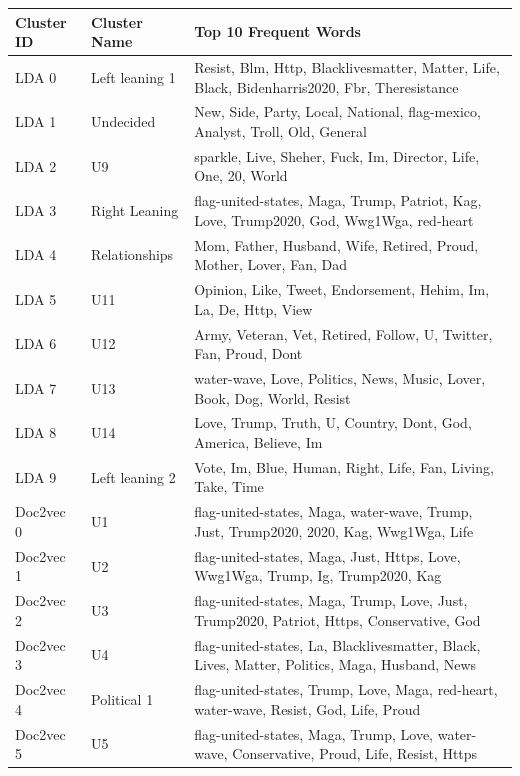 \documentclass{article}
\begin{document}
\begin{table}[h!]
\centering
\begin{tabular}{|l|l|p{13cm}|} 
 \hline
 Cluster ID & Cluster Name & Top 10 Frequent Words \\ [0.5ex] 
 \hline
 LDA 0 & Left leaning 1 & Resist, Blm, Http, Blacklivesmatter, Matter, Life, Black, Bidenharris2020, Fbr, Theresistance \\ \hline 
 LDA 1 & Undecided & New, Side, Party, Local, National, flag-mexico, Analyst, Troll, Old, General \\ \hline
 LDA 2 & U9 & sparkle, Live, Sheher, Fuck, Im, Director, Life, One, 20, World \\ \hline
 LDA 3 & Right Leaning & flag-united-states, Maga, Trump, Patriot, Kag, Love, Trump2020, God, Wwg1Wga, red-heart \\ \hline 
 LDA 4 & Relationships & Mom, Father, Husband, Wife, Retired, Proud, Mother, Lover, Fan, Dad \\ \hline
 LDA 5 & U11 & Opinion, Like, Tweet, Endorsement, Hehim, Im, La, De, Http, View \\ \hline
 LDA 6 & U12 & Army, Veteran, Vet, Retired, Follow, U, Twitter, Fan, Proud, Dont \\ \hline
 LDA 7 & U13 & water-wave, Love, Politics, News, Music, Lover, Book, Dog, World, Resist \\ \hline
 LDA 8 & U14 & Love, Trump, Truth, U, Country, Dont, God, America, Believe, Im \\ \hline
 LDA 9 & Left leaning 2 & Vote, Im, Blue, Human, Right, Life, Fan, Living, Take, Time \\ \hline
 Doc2vec 0 & U1 & flag-united-states, Maga, water-wave, Trump, Just, Trump2020, 2020, Kag, Wwg1Wga, Life \\ \hline 
 Doc2vec 1 & U2 & flag-united-states, Maga, Just, Https, Love, Wwg1Wga, Trump, Ig, Trump2020, Kag \\ \hline
 Doc2vec 2 & U3 & flag-united-states, Maga, Trump, Love, Just, Trump2020, Patriot, Https, Conservative, God \\ \hline
 Doc2vec 3 & U4 & flag-united-states, La, Blacklivesmatter, Black, Lives, Matter, Politics, Maga, Husband, News \\ \hline
 Doc2vec 4 & Political 1 & flag-united-states, Trump, Love, Maga, red-heart, water-wave, Resist, God, Life, Proud \\ \hline
 Doc2vec 5 & U5 & flag-united-states, Maga, Trump, Love, water-wave, Conservative, Proud, Life, Resist, Https \\ \hline

\end{tabular}
\end{table}
\end{document}
